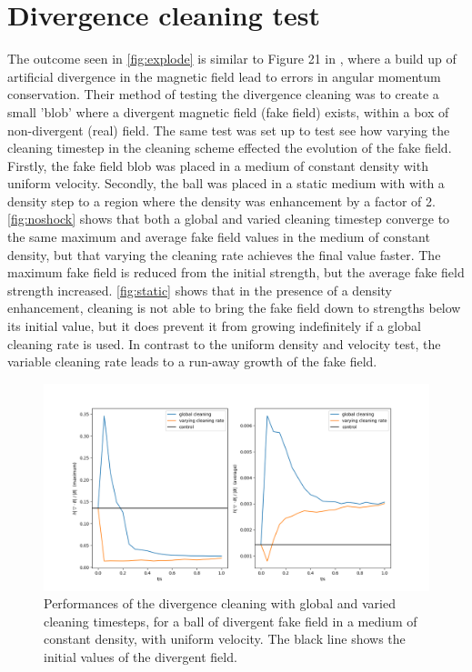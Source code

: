 \documentclass[11pt]{article}
\begin{document}
\section{Divergence cleaning test}
\label{sub:divclean}
The outcome seen in \autoref{fig:explode} is similar to Figure 21 in \cite{Tricco2012}, where a build up of artificial divergence in the magnetic field lead to errors in angular momentum conservation. Their method of testing the divergence cleaning was to create a small 'blob' where a divergent magnetic field (fake field) exists, within a box of non-divergent (real) field. The same test was set up to test see how varying the cleaning timestep in the \cite{Dedner2002} cleaning scheme effected the evolution of the fake field. Firstly, the fake field blob was placed in a medium of constant density with uniform velocity. Secondly, the ball was placed in a static medium with with a density step to a region where the density was enhancement by a factor of 2. \autoref{fig:noshock} shows that both a global and varied cleaning timestep converge to the same maximum and average fake field values in the medium of constant density, but that varying the cleaning rate achieves the final value faster. The maximum fake field is reduced from the initial strength, but the average fake field strength increased. \autoref{fig:static} shows that in the presence of a density enhancement, cleaning is not able to bring the fake field down to strengths below its initial value, but it does prevent it from growing indefinitely if a global cleaning rate is used. In contrast to the uniform density and velocity test, the variable cleaning rate leads to a run-away growth of the fake field.

\begin{figure}[h!]
         \centering
		\includegraphics[width=18cm]{noshock.png}
		\caption{Performances of the \cite{Dedner2002} divergence cleaning with global and varied cleaning timesteps, for a ball of divergent fake field in a medium of constant density, with uniform velocity. The black line shows the initial values of the divergent field.}
		\label{fig:noshock}
\end{figure}
\end{document}
